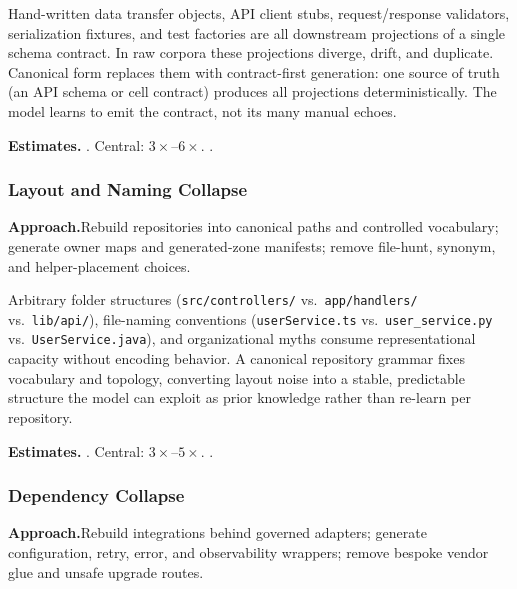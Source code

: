 Hand-written data transfer objects, API client stubs, request/response validators,
serialization fixtures, and test factories are all downstream projections
of a single schema contract.  In raw corpora these projections diverge,
drift, and duplicate.  Canonical form replaces them with contract-first
generation: one source of truth (an API schema or cell contract) produces
all projections deterministically.  The model learns to emit the contract,
not its many manual echoes.

\smallskip\noindent
\textbf{Estimates.}\quad
{}.\quad
Central: $3\times$--$6\times$.\quad
{}.

\subsubsection{Layout and Naming Collapse}
\label{ssec:layout-naming}

\smallskip\noindent
\textbf{Approach.}\quad Rebuild repositories into canonical paths and controlled vocabulary; generate owner maps and generated-zone manifests; remove file-hunt, synonym, and helper-placement choices.

Arbitrary folder structures (\texttt{src/controllers/} vs.\
\texttt{app/handlers/} vs.\ \texttt{lib/api/}), file-naming conventions
(\texttt{userService.ts} vs.\ \texttt{user\_service.py} vs.\
\texttt{UserService.java}), and organizational myths consume
representational capacity without encoding behavior.  A canonical
repository grammar fixes vocabulary and topology, converting layout
noise into a stable, predictable structure the model can exploit as
prior knowledge rather than re-learn per repository.

\smallskip\noindent
\textbf{Estimates.}\quad
{}.\quad
Central: $3\times$--$5\times$.\quad
\aggrange{\textbf{Aggressive:} $5\times$--$8\times$}.

\subsubsection{Dependency Collapse}
\label{ssec:dependency-collapse}

\smallskip\noindent
\textbf{Approach.}\quad Rebuild integrations behind governed adapters; generate configuration, retry, error, and observability wrappers; remove bespoke vendor glue and unsafe upgrade routes.

